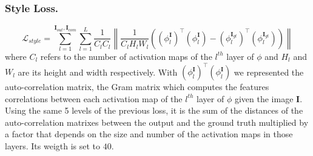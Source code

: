 \documentclass[10pt,twocolumn,letterpaper]{article}
\newcommand\norm[1]{\left\lVert#1\right\rVert}
\begin{document}
\subsubsection{Style Loss.}
\begin{dmath}
        \mathcal{L}_{style} = \sum^{\mathbf{I}_{out},\mathbf{I}_{com}}_{l=1} \sum^L_{l=1} \frac{1}{C_l C_l} \norm{ \frac{1}{C_l H_l W_l} ((\phi^{\mathbf{I}}_l)^\top(\phi^{\mathbf{I}}_l) - (\phi^{\mathbf{I}_{gt}}_l)^\top(\phi^{\mathbf{I}_{gt}}_l)  )}
\end{dmath}
where \(C_l\) refers to the number of activation maps of the \(l^{th}\) layer of \(\phi\) and \(H_l\) and \(W_l\) are its height and width respectively. With \((\phi^{\mathbf{I}}_l)^\top(\phi^{\mathbf{I}}_l)\) we represented the auto-correlation matrix, the Gram matrix\cite{gatys1508neural} which computes the features correlations between each activation map of the \(l^{th}\) layer of \(\phi\) given the image \(\mathbf{I}\).
\\
Using the same 5 levels of the previous loss, it is the sum of the distances of the auto-correlation matrixes between the output and the ground truth multiplied by a factor that depends on the size and number of the activation maps in those layers. Its weigth is set to \(40\).
\end{document}
